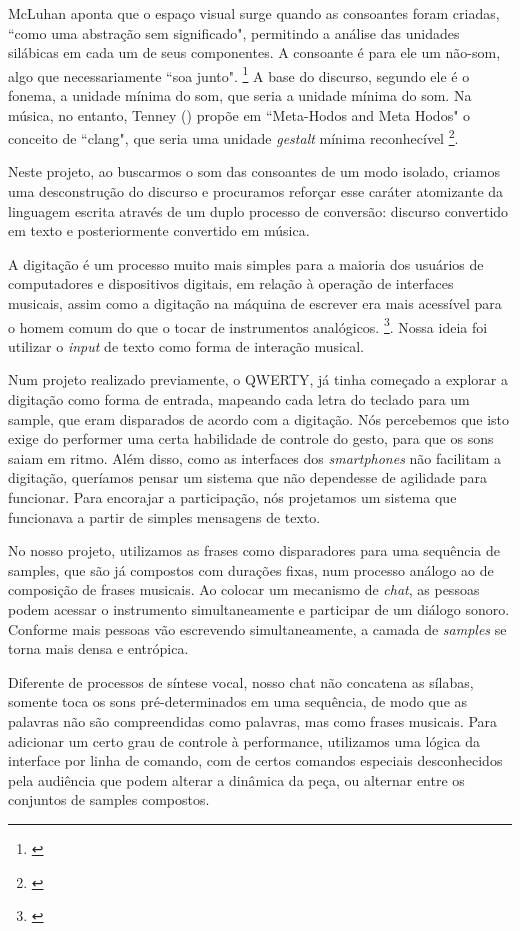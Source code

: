 McLuhan aponta que o espaço visual surge quando as consoantes foram criadas, ``como uma abstração sem significado", permitindo a análise das unidades silábicas em cada um de seus componentes. A consoante é para ele um não-som, algo que necessariamente ``soa junto". \footnote{\cite[13-14]{mcluhan1968comunicaccoes}} A base do discurso, segundo ele é o fonema, a unidade mínima do som, que seria a unidade mínima do som. Na música, no entanto, Tenney (\citeyear{Tenney1988}) propõe em ``Meta-Hodos and Meta Hodos" o conceito de ``clang", que seria uma unidade \emph{gestalt} mínima reconhecível \footnote{\cite[23]{Tenney1988}}. 

Neste projeto, ao buscarmos o som das consoantes de um modo isolado, criamos uma desconstrução do discurso e procuramos reforçar esse caráter atomizante da linguagem escrita através de um duplo processo de conversão: discurso convertido em texto e posteriormente convertido em música.

A digitação é um processo muito mais simples para a maioria dos usuários de computadores e dispositivos digitais, em relação à operação de interfaces musicais, assim como a digitação na máquina de escrever era mais acessível para o homem comum do que o tocar de instrumentos analógicos. \footnote{\cite[172]{Levinson2001}}. Nossa ideia foi utilizar o \emph{input} de texto como forma de interação musical. 

Num projeto realizado previamente, o QWERTY, já tinha começado a explorar a digitação como forma de entrada, mapeando cada letra do teclado para um sample, que eram disparados de acordo com a digitação. Nós percebemos que isto exige do performer uma certa habilidade de controle do gesto, para que os sons saiam em ritmo. Além disso, como as interfaces dos \emph{smartphones} não facilitam a digitação, queríamos pensar um sistema que não dependesse de agilidade para funcionar. Para encorajar a participação, nós projetamos um sistema que funcionava a partir de simples mensagens de texto.

No nosso projeto, utilizamos as frases como disparadores para uma sequência de samples, que são já compostos com durações fixas, num processo análogo ao de composição de frases musicais. Ao colocar um mecanismo de \emph{chat}, as pessoas podem acessar o instrumento simultaneamente e participar de um diálogo sonoro. Conforme mais pessoas vão escrevendo simultaneamente, a camada de \emph{samples} se torna mais densa e entrópica.

Diferente de processos de síntese vocal, nosso chat não concatena as sílabas, somente toca os sons pré-determinados em uma sequência, de modo que as palavras não são compreendidas como palavras, mas como frases musicais. Para adicionar um certo grau de controle à performance, utilizamos uma lógica da interface por linha de comando, com de certos comandos especiais desconhecidos pela audiência que podem alterar a dinâmica da peça, ou alternar entre os conjuntos de samples compostos.

